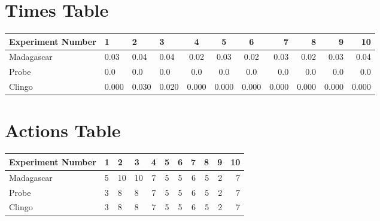 \documentclass[8pt]{article}
\begin{document}
\begin{landscape}
\section{Times Table}\begin{tabular}{ | l | l | l | l | c | c | c | r | r | r | r | }\hline
Experiment Number & 1 & 2 & 3 & 4 & 5 & 6 & 7 & 8 & 9 & 10\\  \hline
Madagascar & 0.03 & 0.04 & 0.04 & 0.02 & 0.03 & 0.02 & 0.03 & 0.02 & 0.03 & 0.04\\  \hline
Probe & 0.0 & 0.0 & 0.0 & 0.0 & 0.0 & 0.0 & 0.0 & 0.0 & 0.0 & 0.0\\  \hline
Clingo & 0.000 & 0.030 & 0.020 & 0.000 & 0.000 & 0.000 & 0.000 & 0.000 & 0.000 & 0.000\\  \hline
\end{tabular}
\section{Actions Table}\begin{tabular}{ | l | l | l | l | c | c | c | r | r | r | r | }\hline
Experiment Number & 1 & 2 & 3 & 4 & 5 & 6 & 7 & 8 & 9 & 10\\ \hline
 Madagascar & 5 & 10 & 10 & 7 & 5 & 5 & 6 & 5 & 2 & 7\\ \hline
 Probe & 3 & 8 & 8 & 7 & 5 & 5 & 6 & 5 & 2 & 7\\ \hline
 Clingo & 3 & 8 & 8 & 7 & 5 & 5 & 6 & 5 & 2 & 7\\ \hline
\end{tabular}
\end{landscape}
\end{document}
